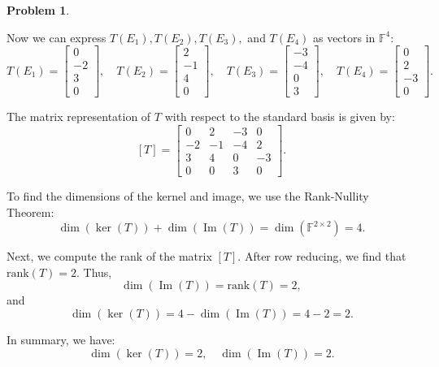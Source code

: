 \documentclass[12pt]{article}
\theoremstyle{definition}
\newtheorem{problem}{Problem}
\DeclareMathOperator{\Ima}{Im}
\begin{document}
\begin{problem}
\begin{solution}
        Now we can express \( T(E_1), T(E_2), T(E_3), \) and \( T(E_4) \) as vectors in \( \mathbb{F}^4 \):
        \[
        T(E_1) = \begin{bmatrix} 0 \\ -2 \\ 3 \\ 0 \end{bmatrix}, \quad T(E_2) = \begin{bmatrix} 2 \\ -1 \\ 4 \\ 0 \end{bmatrix}, \quad T(E_3) = \begin{bmatrix} -3 \\ -4 \\ 0 \\ 3 \end{bmatrix}, \quad T(E_4) = \begin{bmatrix} 0 \\ 2 \\ -3 \\ 0 \end{bmatrix}.
        \]

        The matrix representation of \( T \) with respect to the standard basis is given by:
        \[
        [T] = \begin{bmatrix} 
        0 & 2 & -3 & 0 \\ 
        -2 & -1 & -4 & 2 \\ 
        3 & 4 & 0 & -3 \\ 
        0 & 0 & 3 & 0 
        \end{bmatrix}.
        \]

        To find the dimensions of the kernel and image, we use the Rank-Nullity Theorem:
        \[
        \dim(\ker(T)) + \dim(\Ima(T)) = \dim(\mathbb{F}^{2 \times 2}) = 4.
        \]

        Next, we compute the rank of the matrix \( [T] \). After row reducing, we find that \( \text{rank}(T) = 2 \). Thus,
        \[
        \dim(\Ima(T)) = \text{rank}(T) = 2,
        \]
        and
        \[
        \dim(\ker(T)) = 4 - \dim(\Ima(T)) = 4 - 2 = 2.
        \]

        In summary, we have:
        \[
        \dim(\ker(T)) = 2, \quad \dim(\Ima(T)) = 2.
        \]

    \end{solution}
\end{problem}
\end{document}
